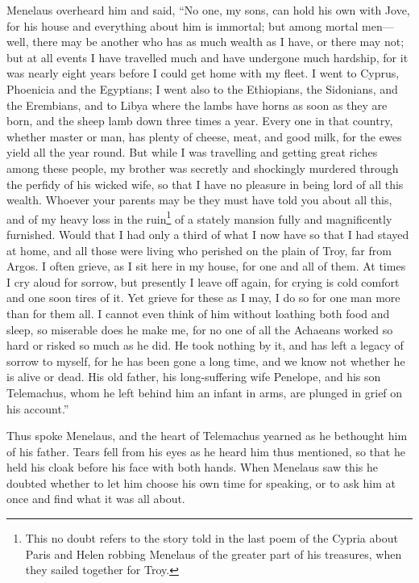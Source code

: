 Menelaus overheard him and said, “No one, my sons, can hold his own with Jove,
for his house and everything about him is immortal; but among mortal men—well,
there may be another who has as much wealth as I have, or there may not; but at
all events I have travelled much and have undergone much hardship, for it was
nearly eight years before I could get home with my fleet. I went to Cyprus,
Phoenicia and the Egyptians; I went also to the Ethiopians, the Sidonians, and
the Erembians, and to Libya where the lambs have horns as soon as they are
born, and the sheep lamb down three times a year. Every one in that country,
whether master or man, has plenty of cheese, meat, and good milk, for the ewes
yield all the year round. But while I was travelling and getting great riches
among these people, my brother was secretly and shockingly murdered through the
perfidy of his wicked wife, so that I have no pleasure in being lord of all
this wealth. Whoever your parents may be they must have told you about all
this, and of my heavy loss in the ruin\footnote{This no doubt refers to the story told in the last poem of the Cypria about
Paris and Helen robbing Menelaus of the greater part of his treasures, when
they sailed together for Troy.} of a stately mansion fully and
magnificently furnished. Would that I had only a third of what I now have so
that I had stayed at home, and all those were living who perished on the plain
of Troy, far from Argos. I often grieve, as I sit here in my house, for one and
all of them. At times I cry aloud for sorrow, but presently I leave off again,
for crying is cold comfort and one soon tires of it. Yet grieve for these as I
may, I do so for one man more than for them all. I cannot even think of him
without loathing both food and sleep, so miserable does he make me, for no one
of all the Achaeans worked so hard or risked so much as he did. He took nothing
by it, and has left a legacy of sorrow to myself, for he has been gone a long
time, and we know not whether he is alive or dead. His old father, his
long-suffering wife Penelope, and his son Telemachus, whom he left behind him
an infant in arms, are plunged in grief on his account.”

Thus spoke Menelaus, and the heart of Telemachus yearned as he bethought him of
his father. Tears fell from his eyes as he heard him thus mentioned, so that he
held his cloak before his face with both hands. When Menelaus saw this he
doubted whether to let him choose his own time for speaking, or to ask him at
once and find what it was all about.

